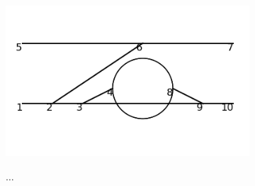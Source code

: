 \documentclass[11pt,a4paper,twoside,pdf]{article}
\numberwithin{equation}{section}
\begin{document}
\begin{figure}[h!]
\begin{subfigure}[t]{0.16\textwidth}
    \end{subfigure}
    \hfill
    \begin{subfigure}[t]{0.16\textwidth}
        \centering
        \includegraphics[width=\textwidth]{plots/order6_2to2/60.png}
    \end{subfigure}

    \begin{subfigure}[t]{0.1\textwidth}
        \centering
        {\LARGE $\ldots$}
    \end{subfigure}
    \vspace{0.5cm}


\end{figure}
\end{document}

